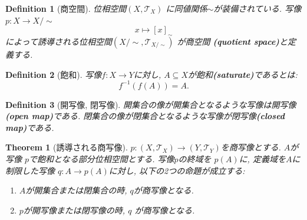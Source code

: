 \documentclass[dvipdfmx]{jbook}
\newtheorem{theorem}{Theorem}[section]
\newtheorem{definition}{Definition}[section]
\theoremstyle{remark}
\theoremstyle{plain}
\begin{document}
\begin{definition}[商空間]
	位相空間$\left( X, \mathcal{T}_X \right) $ に同値関係$\sim$が装備されている. 
	 写像$p: X \to X / \sim $
      $$
	x \mapsto [x]_{\sim}
      $$
      によって誘導される位相空間$\left( X / \sim , \mathcal{T}_{X / \sim} \right) $ が商空間 \textbf{(quotient space)}と定義する.
\end{definition}

\begin{definition}[飽和]
	写像$f:X \to Y$に対し, $A \subseteq X$が飽和\textbf{(saturate)}であるとは:
	\[
	f^{-1}\left(f( A) \right) = A
	.\] 
\end{definition}

\begin{definition}[開写像, 閉写像]
開集合の像が開集合となるような写像は開写像\textbf{(open map)}である. 閉集合の像が閉集合となるような写像が閉写像\textbf{(closed map)}である.	
\end{definition}

\begin{theorem}[誘導される商写像]
	$p: (X,\mathcal{T}_X) \to \left( Y,\mathcal{T}_Y \right) $を商写像とする. $A$が写像 $p$で飽和となる部分位相空間とする.  写像$p$の終域を $p(A)$に, 定義域を$A$に制限した写像 $q: A \to p(A)$に対し, 以下の2つの命題が成立する:
	\begin{enumerate}
		\item $A$が開集合または閉集合の時,  $q$が商写像となる.
		\item  $p$が開写像または閉写像の時,  $q$ が商写像となる.
	\end{enumerate}
\end{theorem}
\end{document}
